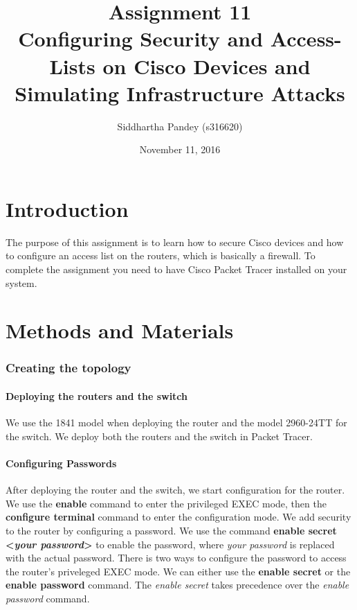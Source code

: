 \documentclass{article}
\date{November 11, 2016}
\title{\textbf{Assignment 11}\\Configuring Security and Access-Lists on Cisco Devices and
Simulating Infrastructure Attacks}
\author{Siddhartha Pandey (s316620)}
\begin{document}
\maketitle
\newpage
\tableofcontents
\newpage

\part{Introduction}

The purpose of this assignment is to learn how to secure Cisco devices and how to configure an access list on the routers, which is basically a firewall. To complete the assignment you need to have Cisco Packet Tracer installed on your system. 

\part{Methods and Materials}


\section{Creating the topology}

\subsection{Deploying the routers and the switch}

We use the 1841 model when deploying the router and the model 2960-24TT for the switch. We deploy both the routers and the switch in Packet Tracer. 


\subsection{Configuring Passwords}
After deploying the router and the switch, we start configuration for the router. We use the \textbf{enable} command to enter the privileged EXEC mode, then the \textbf{configure terminal} command to enter the configuration mode. We add security to the router by configuring a password. We use the command \textbf{enable secret \textless\emph{your password}\textgreater} to enable the password, where \emph{your password} is replaced with the actual password. There is two ways to configure the password to access the router's priveleged EXEC mode. We can either use the \textbf{enable secret} or the \textbf{enable password} command. The \textit{enable secret} takes precedence over the \textit{enable password} command.
\end{document}
